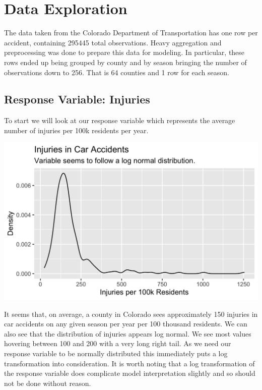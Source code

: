 \section*{Data Exploration}

The data taken from the Colorado Department of Transportation has one row per accident, containing 295445 total observations. Heavy aggregation and preprocessing was done to prepare this data for modeling. In particular, these rows ended up being grouped by county and by season bringing the number of observations down to 256. That is 64 counties and 1 row for each season. 



\subsection*{Response Variable: Injuries}

To start we will look at our response variable which represents the average number of injuries per 100k residents per year. \vspace{0.5cm}

\begin{center}
    \includegraphics[width=0.8\columnwidth]{../presentation/presentation_images/injury_dist.png}
\end{center}

\pagebreak

It seems that, on average, a county in Colorado sees approximately 150 injuries in car accidents on any given season per year per 100 thousand residents. We can also see that the distribution of injuries appears log normal. We see most values hovering between 100 and 200 with a very long right tail. As we need our response variable to be normally distributed this immediately puts a log transformation into consideration. It is worth noting that a log transformation of the response variable does complicate model interpretation slightly and so should not be done without reason.

